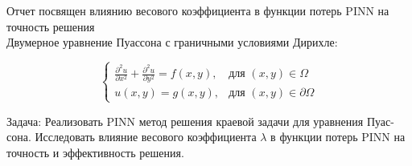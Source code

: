 Отчет посвящен влиянию весового коэффициента в функции потерь PINN на точность решения\\
Двумерное уравнение Пуассона с граничными условиями Дирихле:

\begin{equation}
    \begin{cases}
        \frac{\partial^2 u}{\partial x^2} + \frac{\partial^2 u}{\partial y^2} = f(x, y), & \text{для } (x, y) \in \Omega \\
        u(x, y) = g(x, y), & \text{для } (x, y) \in \partial \Omega
    \end{cases}
\end{equation}

Задача: Реализовать PINN метод решения краевой задачи для уравнения Пуас-
сона. Исследовать влияние весового коэффициента $\lambda$ в функции потерь PINN
на точность и эффективность решения.